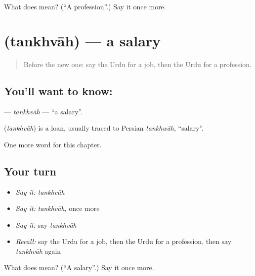 \begin{tcolorbox}[breakable,colback=teal!4,colframe=teal!35!black,title={Before you move on}]
What does  mean? (\textquotedblleft{}A profession\textquotedblright{}.) Say it once more.
\end{tcolorbox}
\section[\texorpdfstring{\ur{تنخواہ} (tankhvāh)}{تنخواہ (tankhvāh)}]{ (tankhvāh) — a salary}

\label{lesson:UR-C176-tankhvah}



\begin{quote}
Before the new one: say the Urdu for a job, then the Urdu for a profession.
\end{quote}

\subsection*{You'll want to know: }
\textbf{} — \emph{tankhvāh} — \textquotedblleft{}a salary\textquotedblright{}.

\begin{cousinweb}
\textbf{} (\emph{tankhvāh}) is a loan, usually traced to Persian \emph{tankhwāh}, \textquotedblleft{}salary\textquotedblright{}.
\end{cousinweb}

\begin{grammarlens}[title={What you've built}]
One more word for this chapter.
\end{grammarlens}

\subsection*{Your turn}
\begin{itemize}
\raggedright
  \item \emph{Say it:} \emph{tankhvāh}
  \item \emph{Say it:} \emph{tankhvāh}, once more
  \item \emph{Say it:} say \emph{tankhvāh}
  \item \emph{Recall:} say the Urdu for a job, then the Urdu for a profession, then say \emph{tankhvāh} again
\end{itemize}

\begin{tcolorbox}[breakable,colback=teal!4,colframe=teal!35!black,title={Before you move on}]
What does  mean? (\textquotedblleft{}A salary\textquotedblright{}.) Say it once more.
\end{tcolorbox}
